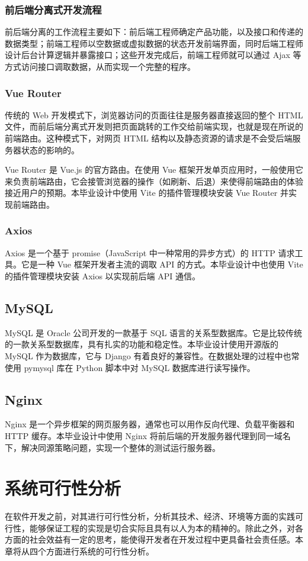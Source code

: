 \documentclass[a4paper,AutoFakeBold,oneside,12pt]{book}
\begin{document}
\subsection{前后端分离式开发流程}
前后端分离的工作流程主要如下：前后端工程师确定产品功能，以及接口和传递的数据类型；前端工程师以空数据或虚拟数据的状态开发前端界面，同时后端工程师设计后台计算逻辑并暴露接口；这些开发完成后，前端工程师就可以通过 Ajax 等方式访问接口调取数据，从而实现一个完整的程序。

\subsection{Vue Router}
传统的 Web 开发模式下，浏览器访问的页面往往是服务器直接返回的整个 HTML 文件，而前后端分离式开发则把页面跳转的工作交给前端实现，也就是现在所说的前端路由。这种模式下，对网页 HTML 结构以及静态资源的请求是不会受后端服务器状态的影响的。

Vue Router 是 Vue.js 的官方路由。在使用 Vue 框架开发单页应用时，一般使用它来负责前端路由，它会接管浏览器的操作（如刷新、后退）来使得前端路由的体验接近用户的预期。\cite{vue_router}本毕业设计中使用 Vite 的插件管理模块安装 Vue Router 并实现前端路由。

\subsection{Axios}
Axios 是一个基于 promise（JavaScript 中一种常用的异步方式）的 HTTP 请求工具。\cite{axios}它是一种 Vue 框架开发者主流的调取 API 的方式。本毕业设计中也使用 Vite 的插件管理模块安装 Axios 以实现前后端 API 通信。

\section{MySQL}
MySQL 是 Oracle 公司开发的一款基于 SQL 语言的关系型数据库。它是比较传统的一款关系型数据库，具有扎实的功能和稳定性。\cite{mysql}本毕业设计使用开源版的 MySQL 作为数据库，它与 Django 有着良好的兼容性。在数据处理的过程中也常使用 pymysql 库在 Python 脚本中对 MySQL 数据库进行读写操作。

\section{Nginx}
Nginx 是一个异步框架的网页服务器，通常也可以用作反向代理、负载平衡器和 HTTP 缓存。\cite{nginx}本毕业设计中使用 Nginx 将前后端的开发服务器代理到同一域名下，解决同源策略问题，实现一个整体的测试运行服务器。


\chapter{系统可行性分析}
在软件开发之前，对其进行可行性分析，分析其技术、经济、环境等方面的实践可行性，能够保证工程的实现是切合实际且具有以人为本的精神的。除此之外，对各方面的社会效益有一定的思考，能使得开发者在开发过程中更具备社会责任感。本章将从四个方面进行系统的可行性分析。
\end{document}
